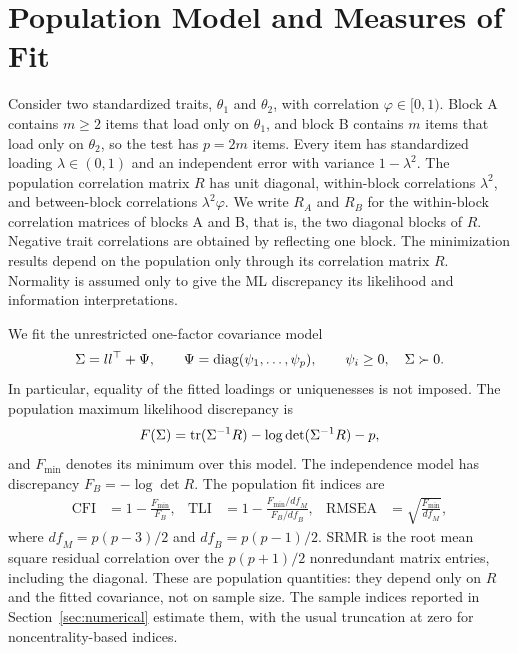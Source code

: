 \section{Population Model and Measures of Fit}
\label{sec:setup}

Consider two standardized traits, $\theta_1$ and $\theta_2$, with correlation $\varphi\in[0,1)$. Block A contains $m\ge2$ items that load only on $\theta_1$, and block B contains $m$ items that load only on $\theta_2$, so the test has $p=2m$ items. Every item has standardized loading $\lambda\in(0,1)$ and an independent error with variance $1-\lambda^2$. The population correlation matrix $R$ has unit diagonal, within-block correlations $\lambda^2$, and between-block correlations $\lambda^2\varphi$. We write $R_A$ and $R_B$ for the within-block correlation matrices of blocks A and B, that is, the two diagonal blocks of $R$. Negative trait correlations are obtained by reflecting one block. The minimization results depend on the population only through its correlation matrix $R$. Normality is assumed only to give the ML discrepancy its likelihood and information interpretations.

We fit the unrestricted one-factor covariance model
\[
\Sigma=ll^{\top}+\Psi,\qquad
\Psi=\operatorname{diag}(\psi_1,\ldots,\psi_p),\qquad
\psi_i\ge0,\quad \Sigma\succ0.
\]
In particular, equality of the fitted loadings or uniquenesses is not imposed. The population maximum likelihood discrepancy is
\begin{equation}
F(\Sigma)=\operatorname{tr}(\Sigma^{-1}R)-\log\det(\Sigma^{-1}R)-p,
\label{eq:ml-discrepancy}
\end{equation}
and $F_{\min}$ denotes its minimum over this model. The independence model has discrepancy $F_B=-\log\det R$. The population fit indices are
\begin{equation}
\begin{aligned}
\mathrm{CFI}&=1-\frac{F_{\min}}{F_B},&
\mathrm{TLI}&=1-\frac{F_{\min}/\mathit{df}_M}{F_B/\mathit{df}_B},&
\mathrm{RMSEA}&=\sqrt{\frac{F_{\min}}{\mathit{df}_M}},
\end{aligned}
\label{eq:population-indices}
\end{equation}
where $\mathit{df}_M=p(p-3)/2$ and $\mathit{df}_B=p(p-1)/2$. SRMR is the root mean square residual correlation over the $p(p+1)/2$ nonredundant matrix entries, including the diagonal. These are population quantities: they depend only on $R$ and the fitted covariance, not on sample size. The sample indices reported in Section~\ref{sec:numerical} estimate them, with the usual truncation at zero for noncentrality-based indices.

